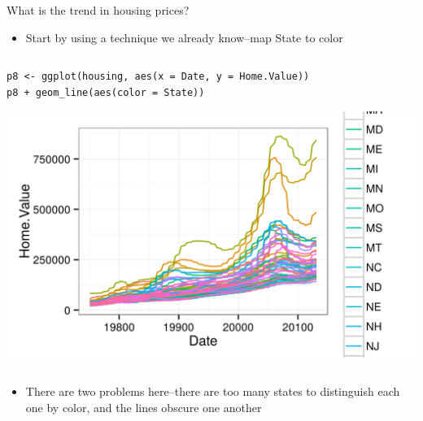 \documentclass[table,smaller]{beamer}
\begin{document}
\begin{frame}[fragile,label=sec-5-3]{What is the trend in housing prices?}
 \begin{itemize}
\item Start by using a technique we already know--map State to color
\end{itemize}

\begin{columns}  \begin{block}{}

\begin{verbatim}
p8 <- ggplot(housing, aes(x = Date, y = Home.Value))
p8 + geom_line(aes(color = State))
\end{verbatim}

\includegraphics[width=.9\linewidth]{images/housing1.png}

\end{block} \end{columns}
\begin{itemize}
\item There are two problems here--there are too many states to distinguish each one by color, and the lines obscure one another
\end{itemize}
\end{frame}
\end{document}
